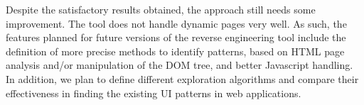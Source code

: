 \documentclass[10pt, conference, compsocconf]{IEEEtran}
\begin{document}
Despite the satisfactory results obtained, the approach still needs some improvement. The tool does not handle dynamic pages very well. As such, the features planned for future versions of the reverse engineering tool include the definition of more precise methods to identify patterns, based on HTML page analysis and/or manipulation of the DOM tree, and better Javascript handling. In addition, we plan to define different exploration algorithms and compare their effectiveness in finding the existing UI patterns in web applications. 



\end{document}

